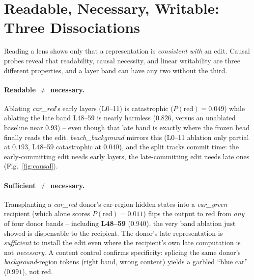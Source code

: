 \section{Readable, Necessary, Writable: Three Dissociations}\label{sec:dissoc}

Reading a lens shows only that a representation is \emph{consistent with}
an edit. Causal probes reveal that readability, causal necessity, and
linear writability are three different properties, and a layer band can
have any two without the third.

\paragraph{Readable $\neq$ necessary.} Ablating \emph{car\_red}'s early
layers (L0--11) is catastrophic ($P(\text{red}){=}0.049$) while ablating
the late band L48--59 is nearly harmless ($0.826$, versus an unablated
baseline near $0.93$) -- even though that late band is exactly where the
frozen head finally reads the edit. \emph{beach\_background} mirrors this
(L0--11 ablation only partial at $0.193$, L48--59 catastrophic at
$0.040$), and the split tracks commit time: the early-committing edit
needs early layers, the late-committing edit needs late ones
(Fig.~\ref{fig:causal}).

\paragraph{Sufficient $\neq$ necessary.} Transplanting a \emph{car\_red}
donor's car-region hidden states into a \emph{car\_green} recipient (which
alone scores $P(\text{red}){=}0.011$) flips the output to red from
\emph{any} of four donor bands -- including \textbf{L48--59} ($0.940$),
the very band ablation just showed is dispensable to the recipient. The
donor's late representation is \emph{sufficient} to install the edit even
where the recipient's own late computation is not \emph{necessary}. A
content control confirms specificity: splicing the same donor's
\emph{background}-region tokens (right band, wrong content) yields a
garbled ``blue car'' ($0.991$), not red.

